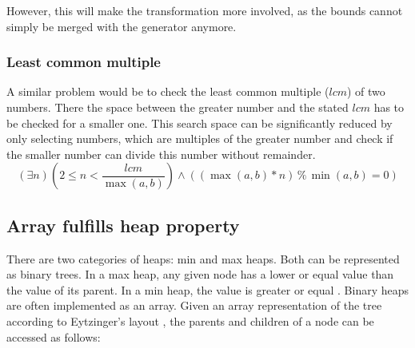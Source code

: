 \documentclass{article}
\begin{document}
However, this will make the transformation more involved, as the bounds cannot simply be merged with the generator anymore.

\subsubsection{Least common multiple}
A similar problem would be to check the least common multiple ($lcm$) of two numbers. There the space between the greater number and the stated $lcm$ has to be checked for a smaller one. This search space can be significantly reduced by only selecting numbers, which are multiples of the greater number and check if the smaller number can divide this number without remainder.
\begin{equation}\label{eq:lcm-existential}
    (\exists n) (2 \le n < \frac{lcm}{\max(a,b)}) \land ((\max(a,b)*n) \mathbin{\%} \min(a,b) = 0)
\end{equation}

\subsection{Array fulfills heap property}\label{subsec:heap}
There are two categories of heaps: min and max heaps. Both can be represented as binary trees. In a max heap, any given node has a lower or equal value than the value of its parent. In a min heap, the value is greater or equal \cite{heapwiki}. Binary heaps are often implemented as an array. Given an array representation of the tree according to Eytzinger's layout \cite{tree_array}, the parents and children of a node can be accessed as follows: \cite{heapgeeks}
\end{document}
